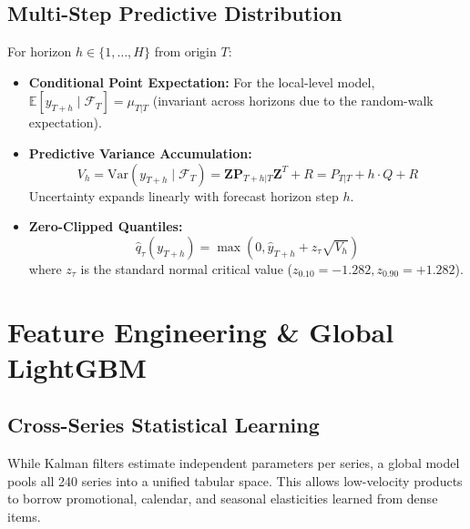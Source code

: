 \documentclass[conference]{IEEEtran}
\begin{document}
\subsection{Multi-Step Predictive Distribution}
For horizon $h \in \{1,\dots,H\}$ from origin $T$:
\begin{itemize}
    \item \textbf{Conditional Point Expectation:} For the local-level model, $\mathbb{E}[y_{T+h} \mid \mathcal{F}_T] = \mu_{T|T}$ (invariant across horizons due to the random-walk expectation).
    \item \textbf{Predictive Variance Accumulation:}
    \begin{equation}
    V_h = \text{Var}(y_{T+h} \mid \mathcal{F}_T) = \mathbf{Z} \mathbf{P}_{T+h|T} \mathbf{Z}^T + R = P_{T|T} + h \cdot Q + R
    \end{equation}
    Uncertainty expands linearly with forecast horizon step $h$.
    \item \textbf{Zero-Clipped Quantiles:}
    \begin{equation}
    \hat{q}_\tau(y_{T+h}) = \max\left(0, \hat{y}_{T+h} + z_\tau \sqrt{V_h}\right)
    \end{equation}
    where $z_\tau$ is the standard normal critical value ($z_{0.10} = -1.282, z_{0.90} = +1.282$).
\end{itemize}

\section{Feature Engineering \& Global LightGBM}

\subsection{Cross-Series Statistical Learning}
While Kalman filters estimate independent parameters per series, a global model pools all 240 series into a unified tabular space. This allows low-velocity products to borrow promotional, calendar, and seasonal elasticities learned from dense items.
\end{document}
